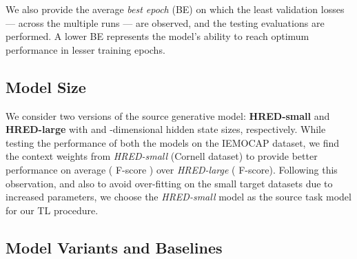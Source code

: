 \documentclass[preprint,3pt]{elsarticle}
\begin{document}
We also provide the average \textit{best epoch} (BE) on which the least validation losses --- across the multiple runs --- are observed, and the testing evaluations are performed. A lower BE represents the model's ability to reach optimum performance in lesser training epochs.



\subsection{Model Size}
We consider two versions of the source generative model: \textbf{HRED-small} and \textbf{HRED-large} with  and -dimensional hidden state sizes, respectively. While testing the performance of both the models on the IEMOCAP dataset, we find the context weights from \textit{HRED-small} (Cornell dataset) to provide better performance on average ( F-score ) over \textit{HRED-large} ( F-score). Following this observation, and also to avoid over-fitting on the small target datasets due to increased parameters, we choose the \textit{HRED-small} model as the source task model for our TL procedure.

\subsection{Model Variants and Baselines} \label{sec:baselines}
\end{document}
